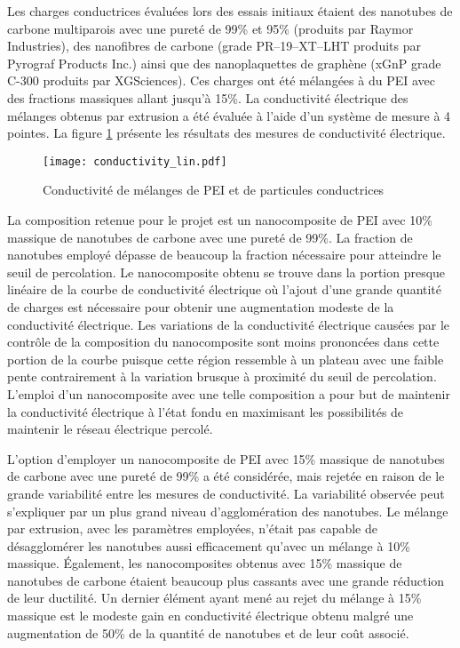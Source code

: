 Les charges conductrices évaluées lors des essais initiaux étaient des nanotubes de carbone multiparois avec une pureté de 99\% et 95\% (produits par Raymor Industries), des nanofibres de carbone (grade PR--19--XT--LHT produits par Pyrograf Products Inc.) ainsi que des nanoplaquettes de graphène (xGnP grade C-300 produits par XGSciences). 
Ces charges ont été mélangées à du PEI avec des fractions massiques allant jusqu'à 15\%.
La conductivité électrique des mélanges obtenus par extrusion a été évaluée à l'aide d'un système de mesure à 4 pointes. 
La figure \ref{fig:conductivite_lin} présente les résultats des mesures de conductivité électrique. 

\begin{figure}[h]
	\centering
	\texttt{[image: conductivity\_lin.pdf]}
	\caption{Conductivité de mélanges de PEI et de particules conductrices}
	\label{fig:conductivite_lin}
\end{figure}
 
La composition retenue pour le projet est un nanocomposite de PEI avec 10\% massique de nanotubes de carbone avec une pureté de 99\%. 
La fraction de nanotubes employé dépasse de beaucoup la fraction nécessaire pour atteindre le seuil de percolation.
Le nanocomposite obtenu se trouve dans la portion presque linéaire de la courbe de conductivité électrique où l'ajout d'une grande quantité de charges est nécessaire pour obtenir une augmentation modeste de la conductivité électrique. 
Les variations de la conductivité électrique causées par le contrôle de la composition du nanocomposite sont moins prononcées dans cette portion de la courbe puisque cette région ressemble à un plateau avec une faible pente contrairement à la variation brusque à proximité du seuil de percolation. 
L'emploi d'un nanocomposite avec une telle composition a pour but de maintenir la conductivité électrique à l'état fondu en maximisant les possibilités de maintenir le réseau électrique percolé. 

L'option d'employer un nanocomposite de PEI avec 15\% massique de nanotubes de carbone avec une pureté de 99\% a été considérée, mais rejetée en raison de le grande variabilité entre les mesures de conductivité. 
La variabilité observée peut s'expliquer par un plus grand niveau d'agglomération des nanotubes.  
Le mélange par extrusion, avec les paramètres employées, n'était pas capable de désagglomérer les nanotubes aussi efficacement qu'avec un mélange à 10\% massique. 
Également, les nanocomposites obtenus avec 15\% massique de nanotubes de carbone étaient beaucoup plus cassants avec une grande réduction de leur ductilité. 
Un dernier élément ayant mené au rejet du mélange à 15\% massique est le modeste gain en conductivité électrique obtenu malgré une augmentation de 50\% de la quantité de nanotubes et de leur coût associé. 
 

